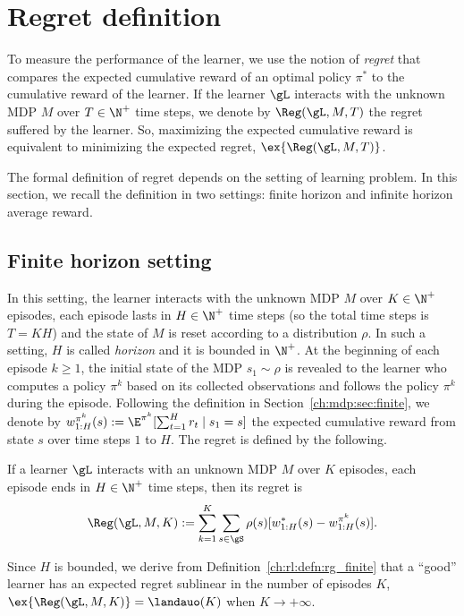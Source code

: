 \section{Regret definition}

To measure the performance of the learner, we use the notion of \emph{regret} that compares the expected cumulative reward of an optimal policy $\pi^*$ to the cumulative reward of the learner. 
If the learner $\gL$ interacts with the unknown MDP $M$ over $T\in\N^+$ time steps, we denote by $\Reg(\gL, M, T)$ the regret suffered by the learner.
So, maximizing the expected cumulative reward is equivalent to minimizing the expected regret, $\ex{\Reg(\gL, M, T)}$.

The formal definition of regret depends on the setting of learning problem.
In this section, we recall the definition in two settings: finite horizon and infinite horizon average reward.

\subsection{Finite horizon setting}
In this setting, the learner interacts with the unknown MDP $M$ over $K\in\N^+$ episodes, each episode lasts in $H\in\N^+$ time steps (so the total time steps is $T=KH$) and the state of $M$ is reset according to a distribution $\rho$.
In such a setting, $H$ is called \emph{horizon} and it is bounded in $\N^+$.
At the beginning of each episode $k\ge1$, the initial state of the MDP $s_1\sim\rho$ is revealed to the learner who computes a policy $\pi^k$ based on its collected observations and follows the policy $\pi^k$ during the episode.
Following the definition in Section~\ref{ch:mdp:sec:finite}, we denote by $w^{\pi^k}_{1:H}(s):=\E^{\pi^k}[\sum_{t=1}^{H}r_t \mid s_1=s]$ the expected cumulative reward from state $s$ over time steps $1$ to $H$.
The regret is defined by the following.
\begin{defn}
    If a learner $\gL$ interacts with an unknown MDP $M$ over $K$ episodes, each episode ends in $H\in\N^+$ time steps, then its regret is
    \begin{equation}
        \label{eq:rg_finite}
        \Reg(\gL, M, K):= \sum_{k=1}^K\sum_{s\in\gS}\rho(s)[w^*_{1:H}(s) -w^{\pi^k}_{1:H}(s)].
    \end{equation}
    \label{ch:rl:defn:rg_finite}
\end{defn}
Since $H$ is bounded, we derive from Definition~\ref{ch:rl:defn:rg_finite} that a ``good'' learner has an expected regret sublinear in the number of episodes $K$, $\ex{\Reg(\gL, M, K)}=\landauo(K)$ when $K\to+\infty$.

